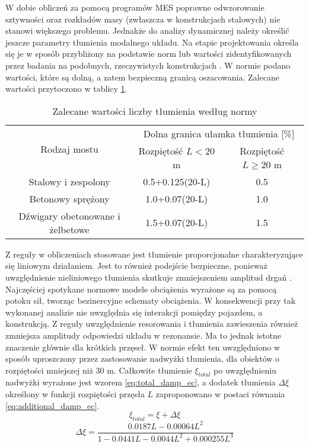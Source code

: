 W dobie obliczeń za pomocą programów MES poprawne odwzorowanie sztywności oraz rozkładów masy (zwłaszcza w konstrukcjach stalowych) nie stanowi większego problemu. Jednakże do analizy dynamicznej należy określić jeszcze parametry tłumienia modalnego układu. Na etapie projektowania określa się je w sposób przybliżony na podstawie norm lub wartości zidentyfikowanych przez badania na podobnych, rzeczywistych konstrukcjach \parencite{Ladislav1996}. W normie \cite{PKNj} podano wartości, które są dolną, a zatem bezpieczną granicą oszacowania. Zalecane wartości przytoczono w tablicy \ref{tab:damping_code_eurocode}. 
\begin{table}[hbt!]
	\centering
	\footnotesize
	\caption{Zalecane wartości liczby tłumienia według normy \cite{PKNj}}
	\begin{tabular}{@{}ccc@{}}
		\toprule
		\multirow{2}{*}{Rodzaj mostu}    & \multicolumn{2}{c}{Dolna granica ułamka tłumienia {[}\%{]}} \\ \cmidrule(l){2-3} 
		& Rozpiętość $L<20$m         & Rozpiętość $L\ge 20$ m         \\ \midrule
		Stalowy i zespolony              & 0.5+0.125(20-L)            & 0.5                            \\ \midrule
		Betonowy sprężony                & 1.0+0.07(20-L)             & 1.0                            \\ \midrule
		Dźwigary obetonowane i żelbetowe & 1.5+0.07(20-L)             & 1.5                            \\ \bottomrule
	\end{tabular}
	\label{tab:damping_code_eurocode}
\end{table}
Z reguły w obliczeniach stosowane jest tłumienie proporcjonalne charakteryzujące się liniowym działaniem. Jest to również podejście bezpieczne, ponieważ uwzględnienie nieliniowego tłumienia skutkuje zmniejszeniem amplitud drgań \parencite{Ulker-Kaustell2012a,Oleszek2015}. 
Najczęściej spotykane normowe modele obciążenia wyrażone są za pomocą potoku sił, tworząc bezinercyjne schematy obciążenia. W konsekwencji przy tak wykonanej analizie nie uwzględnia się interakcji pomiędzy pojazdem, a konstrukcją. Z reguły uwzględnienie resorowania i tłumienia zawieszenia również zmniejsza amplitudy odpowiedzi układu w rezonansie. Ma to jednak istotne znaczenie głównie dla krótkich przęseł. W normie \cite{PKNj} efekt ten uwzględniono w sposób uproszczony przez zastosowanie nadwyżki tłumienia, dla obiektów o rozpiętości mniejszej niż 30 m. Całkowite tłumienie $\xi_{total}$ po uwzględnieniu nadwyżki wyrażone jest wzorem \ref{eq:total_damp_ec}, a dodatek tłumienia $\Delta \xi$ określony w funkcji rozpiętości przęsła $L$ zaproponowano w postaci równania \ref{eq:additional_damp_ec}.
\begin{equation} \label{eq:total_damp_ec}
	\xi_{total}=\xi + \Delta \xi
\end{equation}
\begin{equation} \label{eq:additional_damp_ec}
	\Delta \xi =\frac{0.0187L-0.00064L^2}{1-0.0441L-0.0044L^2+0.000255L^3}
\end{equation}








